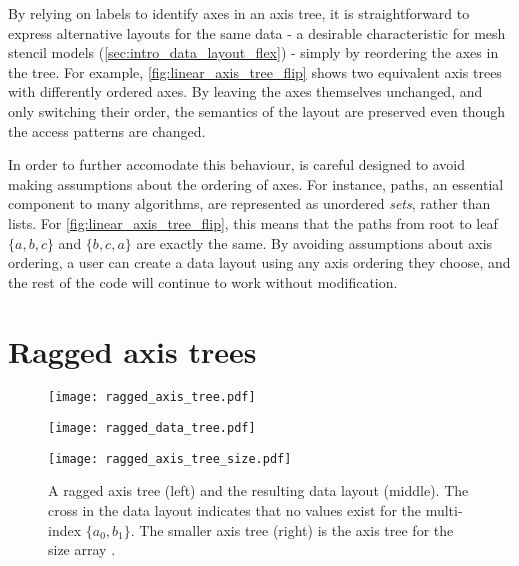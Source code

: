 \documentclass[thesis]{subfiles}
\begin{document}
By relying on labels to identify axes in an axis tree, it is straightforward to express alternative layouts for the same data - a desirable characteristic for mesh stencil models (\cref{sec:intro_data_layout_flex}) - simply by reordering the axes in the tree.
For example, \cref{fig:linear_axis_tree_flip} shows two equivalent axis trees with differently ordered axes.
By leaving the axes themselves unchanged, and only switching their order, the semantics of the layout are preserved even though the access patterns are changed.

In order to further accomodate this behaviour,  is careful designed to avoid making assumptions about the ordering of axes.
For instance, paths, an essential component to many algorithms, are represented as unordered \emph{sets}, rather than lists.
For \cref{fig:linear_axis_tree_flip}, this means that the paths from root to leaf $\{ a, b, c \}$ and $\{ b, c, a \}$ are exactly the same.
By avoiding assumptions about axis ordering, a user can create a data layout using any axis ordering they choose, and the rest of the code will continue to work without modification.

\section{Ragged axis trees}
\label{sec:ragged_axis_trees}

\begin{figure}
  \centering
  \begin{minipage}{.35\textwidth}
    \begin{center}
      \texttt{[image: ragged\_axis\_tree.pdf]}
    \end{center}
  \end{minipage}
  \begin{minipage}{.4\textwidth}
    \begin{center}
      \texttt{[image: ragged\_data\_tree.pdf]}
    \end{center}
  \end{minipage}
  \begin{minipage}{.2\textwidth}
    \begin{center}
      \texttt{[image: ragged\_axis\_tree\_size.pdf]}
    \end{center}
  \end{minipage}
  \caption{
    A ragged axis tree (left) and the resulting data layout (middle).
    The cross in the data layout indicates that no values exist for the multi-index $\{a_0, b_1\}$.
    The smaller axis tree (right) is the axis tree for the size array \pycode{[[1,0],[2,1]][?$i_a$?,?$i_b$?]}.
  }
  \label{fig:ragged_axis_tree}
\end{figure}
\end{document}
